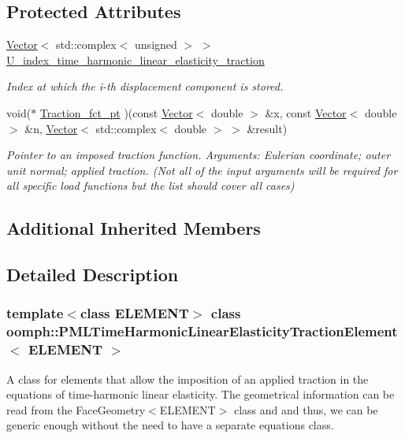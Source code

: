 \subsection*{Protected Attributes}
\begin{DoxyCompactItemize}
\item 
\hyperlink{classoomph_1_1Vector}{Vector}$<$ std\+::complex$<$ unsigned $>$ $>$ \hyperlink{classoomph_1_1PMLTimeHarmonicLinearElasticityTractionElement_a8fd99f484eb4629b4ae7d3d76e0a95ec}{U\+\_\+index\+\_\+time\+\_\+harmonic\+\_\+linear\+\_\+elasticity\+\_\+traction}
\begin{DoxyCompactList}\small\item\em Index at which the i-\/th displacement component is stored. \end{DoxyCompactList}\item 
void($\ast$ \hyperlink{classoomph_1_1PMLTimeHarmonicLinearElasticityTractionElement_ae7504f02abb41d99815ed97bec261672}{Traction\+\_\+fct\+\_\+pt} )(const \hyperlink{classoomph_1_1Vector}{Vector}$<$ double $>$ \&x, const \hyperlink{classoomph_1_1Vector}{Vector}$<$ double $>$ \&n, \hyperlink{classoomph_1_1Vector}{Vector}$<$ std\+::complex$<$ double $>$ $>$ \&result)
\begin{DoxyCompactList}\small\item\em Pointer to an imposed traction function. Arguments\+: Eulerian coordinate; outer unit normal; applied traction. (Not all of the input arguments will be required for all specific load functions but the list should cover all cases) \end{DoxyCompactList}\end{DoxyCompactItemize}
\subsection*{Additional Inherited Members}


\subsection{Detailed Description}
\subsubsection*{template$<$class E\+L\+E\+M\+E\+NT$>$\newline
class oomph\+::\+P\+M\+L\+Time\+Harmonic\+Linear\+Elasticity\+Traction\+Element$<$ E\+L\+E\+M\+E\+N\+T $>$}

A class for elements that allow the imposition of an applied traction in the equations of time-\/harmonic linear elasticity. The geometrical information can be read from the Face\+Geometry$<$\+E\+L\+E\+M\+E\+N\+T$>$ class and and thus, we can be generic enough without the need to have a separate equations class. 

